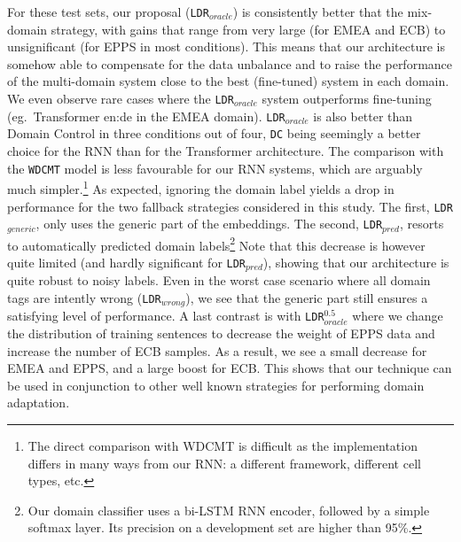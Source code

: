 \documentclass[11pt,a4paper]{article}
\newcommand{\fyTodo}[1]{\Todo[FY:]{\textcolor{orange}{#1}}}
\newcommand{\fyDone}[1]{\done[FY]\Todo[FY:]{\textcolor{orange}{#1}}}
\begin{document}
For these test sets, our proposal (\texttt{LDR}$_{oracle}$) is consistently better that the mix-domain strategy, with gains that range from very large (for EMEA and ECB) to unsignificant (for EPPS in most conditions). This means that our architecture is somehow able to compensate for the data unbalance and to raise the performance of the multi-domain system close to the best (fine-tuned) system in each domain. We even observe rare cases where the \texttt{LDR}$_{oracle}$ system outperforms fine-tuning (eg.\ Transformer en:de in the EMEA domain). \texttt{LDR}$_{oracle}$ is also better than Domain Control in three conditions out of four, \texttt{DC} being seemingly a better choice for the RNN than for the Transformer architecture. The comparison with the \texttt{WDCMT} model is less favourable for our RNN systems, which are arguably much simpler.\footnote{The direct comparison with WDCMT is difficult as the implementation differs in many ways from our RNN: a different framework, different cell types,
  etc.} \fyDone{More on this.}
As expected, ignoring the domain label yields a drop in performance for the two fallback strategies considered in this study. The first, \texttt{LDR}$_{generic}$, only uses the generic part of the embeddings. The second, \texttt{LDR}$_{pred}$, resorts to automatically predicted domain labels\footnote{Our domain classifier uses a bi-LSTM RNN encoder, followed by a simple softmax layer. Its precision on a development set are higher than 95\%.}
\fyDone{Explain how} Note that this decrease is however quite limited (and hardly significant for \texttt{LDR}$_{pred}$), showing that our architecture is quite robust to noisy labels. Even in the worst case scenario where all domain tags are intently wrong (\texttt{LDR}$_{wrong}$), we see that the generic part still ensures a satisfying level of performance. A last contrast is with \texttt{LDR}$_{oracle}^{0.5}$ where we change the distribution of training sentences to decrease the weight of EPPS data and increase the number of ECB samples. As a result, we see a small decrease for EMEA and EPPS, and a large boost for ECB. This shows that our technique can be used in conjunction to other well known strategies for performing domain adaptation. 

\end{document}
